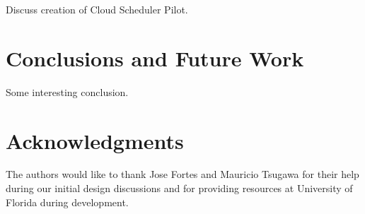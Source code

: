 \documentclass{acm_proc_article-sp}
\begin{document}
Discuss creation of Cloud Scheduler Pilot.

\section{Conclusions and Future Work}
\label{Sec:Conclusions}

Some interesting conclusion.

\section{Acknowledgments}

The authors would like to thank Jose Fortes and Mauricio Tsugawa for their help during our initial design discussions and for providing resources at University of Florida during development.


  
\end{document}
